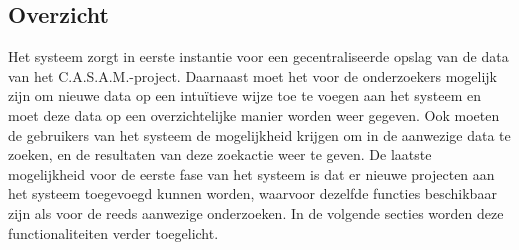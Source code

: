 \subsection{Overzicht}
\label{overzicht}

Het systeem zorgt in eerste instantie voor een gecentraliseerde opslag van de data van het C.A.S.A.M.-project.
Daarnaast moet het voor de onderzoekers mogelijk zijn om nieuwe data op een intu\"itieve wijze toe te voegen aan het systeem en moet deze data op een overzichtelijke manier worden weer gegeven.
Ook moeten de gebruikers van het systeem de mogelijkheid krijgen om in de aanwezige data te zoeken, en de resultaten van deze zoekactie weer te geven.
De laatste mogelijkheid voor de eerste fase van het systeem is dat er nieuwe projecten aan het systeem toegevoegd kunnen worden, waarvoor dezelfde functies beschikbaar zijn als voor de reeds aanwezige onderzoeken. In de volgende secties worden deze functionaliteiten verder toegelicht.
